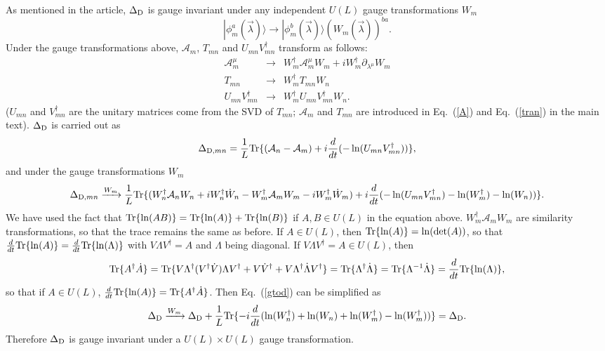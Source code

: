 \documentclass[aps,pra,twocolumn,groupedaddress,10pt]{revtex4}
\begin{document}
\begin{widetext}
As mentioned in the article, $\Delta_{\rm{D}}$ is gauge invariant under any independent $U(L)$ gauge transformations $W_{m}$
\begin{equation}
	|\phi_{m}^{a}(\vec{\lambda})\rangle \rightarrow |\phi_{m}^{b}(\vec{\lambda})\rangle (W_{m}(\vec{\lambda}))^{ba}.
\end{equation}
Under the gauge transformations above, $\mathcal{A}_{m}$, $T_{mn}$ and $U_{mn}V_{mn}^{\dag}$ transform as follows:
\begin{eqnarray}
	\mathcal{A}_{m}^{\mu} &\rightarrow & W_{m}^{\dag}\mathcal{A}_{m}^{\mu}W_{m} + i W_{m}^{\dag} \partial_{\lambda^{\mu}}W_{m}\label{gaugetrans1}\\
	T_{mn} &\rightarrow & W_{m}^{\dag} T_{mn} W_{n}\label{gaugetrans2} \\
	U_{mn}V_{mn}^{\dag} &\rightarrow & W_{m}^{\dag}U_{mn}V_{mn}^{\dag}W_{n}.
\label{gaugetrans3}	
\end{eqnarray}
($U_{mn}$ and $V_{mn}^{\dag}$ are the unitary matrices come from the SVD of $T_{mn}$; $\mathcal{A}_{m}$ and $T_{mn}$ are introduced in Eq.~(\ref{A}) and Eq.~(\ref{tran}) in the main text). $\Delta_{\rm{D}}$ is carried out as
\begin{equation}
	\Delta_{{\rm{D}}, mn} = \frac{1}{L} {\rm{Tr}} \{(\mathcal{A}_{n}-\mathcal{A}_{m})+i\frac{d}{dt}(-\ln(U_{mn}V_{mn}^\dag))\},
\end{equation}
and under the gauge transformations $W_{m}$
\begin{equation}\label{gtod}
\Delta_{{\rm{D}},mn}\xrightarrow{W_{m}}{} 	\frac{1}{L} {\rm{Tr}} \{(W_{n}^{\dag}\mathcal{A}_{n}W_{n} + i W_{n}^{\dag}\dot{W}_n -W_{m}^{\dag}\mathcal{A}_{m}W_{m} - i W_{m}^{\dag}\dot{W}_m )+i\frac{d}{dt}(-\ln(U_{mn}V_{mn}^\dag) -\ln(W_m^\dag) - \ln(W_n)) \}.
\end{equation}
We have used the fact that ${\rm{Tr}} \{ \ln(AB)\} = {\rm{Tr}}\{\ln(A) \} + {\rm{Tr}}\{\ln(B)\}$ if $A, B \in U(L) $ in the equation above.
$W_{m}^{\dag}\mathcal{A}_{m}W_{m}$ are similarity transformations, so that the trace remains the same as before. If $A \in U(L)$, then ${\rm{Tr}} \{\ln(A)\} = \ln(\det(A))$, so that $\frac{d}{dt} {\rm{Tr}} \{\ln(A)\} = \frac{d}{dt} {\rm{Tr}} \{\ln(\Lambda)\}$ with $V\Lambda V^\dag = A$ and $\Lambda$ being diagonal. If $V\Lambda V^\dag = A \in U(L)$, then
\begin{equation}
	{\rm{Tr}} \{A^\dag \dot{A}\} = {\rm{Tr}} \{V\Lambda^\dag (V^\dag \dot{V})\Lambda V^\dag + V\dot{V}^\dag + V \Lambda^\dag \dot{\Lambda}V^\dag\} = {\rm{Tr}} \{\Lambda^\dag \dot{\Lambda} \} = {\rm{Tr}} \{\Lambda^{-1} \dot{\Lambda} \} = \frac{d}{dt} {\rm{Tr}} \{\ln(\Lambda)\},
\end{equation}
so that if $A \in U(L)$, $\frac{d}{dt} {\rm{Tr}} \{\ln(A)\} = {\rm{Tr}} \{A^\dag \dot{A}\}$. Then Eq.~(\ref{gtod}) can be simplified as
\begin{equation}
	\Delta_{\rm{D}} \xrightarrow{W_{m}}{}  \Delta_{\rm{D}} + \frac{1}{L} {\rm{Tr}} \{-i\frac{d}{dt}(\ln(W_n^\dag) + \ln(W_n) + \ln(W_m^\dag) - \ln(W_m^\dag)) \} = \Delta_{\rm{D}}.
\end{equation}
Therefore $\Delta_{\rm{D}}$ is gauge invariant under a $U(L)\times U(L)$ gauge transformation.




\end{widetext}
\end{document}
